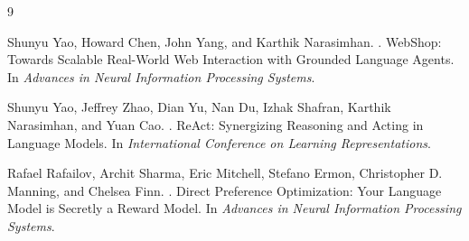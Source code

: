 \documentclass[11pt]{article}
\begin{document}
\begin{thebibliography}{9}

Shunyu Yao, Howard Chen, John Yang, and Karthik Narasimhan.
.
\newblock WebShop: Towards Scalable Real-World Web Interaction with Grounded Language Agents.
\newblock In \textit{Advances in Neural Information Processing Systems}.

Shunyu Yao, Jeffrey Zhao, Dian Yu, Nan Du, Izhak Shafran, Karthik Narasimhan, and Yuan Cao.
.
\newblock ReAct: Synergizing Reasoning and Acting in Language Models.
\newblock In \textit{International Conference on Learning Representations}.

Rafael Rafailov, Archit Sharma, Eric Mitchell, Stefano Ermon, Christopher D. Manning, and Chelsea Finn.
.
\newblock Direct Preference Optimization: Your Language Model is Secretly a Reward Model.
\newblock In \textit{Advances in Neural Information Processing Systems}.

\end{thebibliography}
\end{document}
